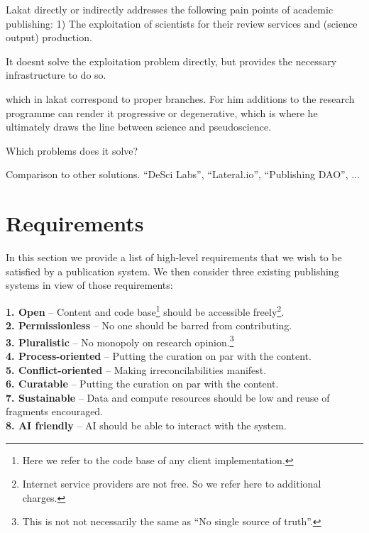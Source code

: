\documentclass[14pt]{article}
\begin{document}
Lakat directly or indirectly addresses the following pain points of academic publishing: 1) The exploitation of scientists for their review services and (science output) production.

It doesnt solve the exploitation problem directly, but provides the necessary infrastructure to do so.


which in lakat correspond to proper branches. For him additions to the research programme can render it progressive or degenerative, which is where he ultimately draws the line between science and pseudoscience. 

Which problems does it solve?

Comparison to other solutions. 
``DeSci Labs'', ``Lateral.io'', ``Publishing DAO'', ...

\section{Requirements}

In this section we provide a list of high-level requirements that we wish to be satisfied by a publication system. We then consider three existing publishing systems in view of those requirements:

\indent \textbf{1. Open} -- 
 Content and code base\footnote{Here we refer to the code base of any client implementation.} should be accessible freely\footnote{Internet service providers are not free. So we refer here to additional charges.}.\\
\indent\textbf{2. Permissionless} --
 No one should be barred from contributing.\\
\indent\textbf{3. Pluralistic} -- No monopoly on research opinion.\footnote{This is not not necessarily the same as ``No single source of truth''.}\\
\indent\textbf{4. Process-oriented} -- Putting the curation on par with the content.\\
\indent\textbf{5. Conflict-oriented} -- Making irreconcilabilities manifest.\\
\indent\textbf{6. Curatable} -- Putting the curation on par with the content.\\
\indent\textbf{7. Sustainable} -- 
 Data and compute resources should be low and reuse of fragments encouraged.\\
\indent\textbf{8. AI friendly} -- AI should be able to interact with the system.\\
\end{document}
